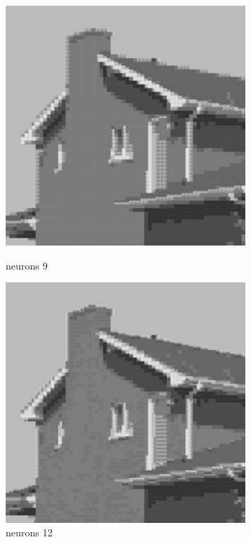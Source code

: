 \documentclass[../IDP_Task5_Karwowski_Kowalewski.tex]{subfiles}
\begin{document}
{{        \begin{figure}[!htbp]
            \begin{minipage}[c]{0.45\linewidth}
                \centering
                \includegraphics[width=0.8\textwidth]{img/kowalewski/crop_size_4_neurons_9.png}
                \caption{neurons 9}
            \end{minipage}\hfill
            \begin{minipage}[c]{0.45\linewidth}
                \centering
                \includegraphics[width=0.8\textwidth]{img/kowalewski/crop_size_4_neurons_12.png}
                \caption{neurons 12}
            \end{minipage}
        \end{figure}

}}
\end{document}

